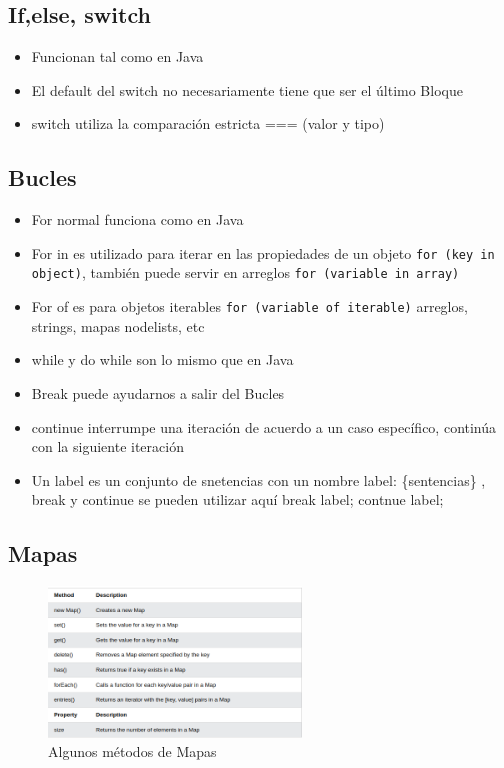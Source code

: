 \documentclass{article}
\begin{document}
 \subsection{If,else, switch}

 \begin{itemize}
   \item Funcionan tal como en Java
   \item El default del switch no necesariamente tiene que ser el último Bloque
   \item switch utiliza la comparación estricta === (valor y tipo)
 \end{itemize}

 \subsection{Bucles}

 \begin{itemize}
   \item For normal funciona como en Java
   \item For in es utilizado para iterar en las propiedades de un objeto \lstinline{for (key in object)}, también puede servir en arreglos \lstinline{for (variable in array)}
   \item For of es para objetos iterables \lstinline{for (variable of iterable)} arreglos, strings, mapas nodelists, etc
   \item while y do while son lo mismo que en Java
   \item Break puede ayudarnos a salir del Bucles
   \item continue  interrumpe una iteración de acuerdo a un caso específico, continúa con la siguiente iteración
   \item Un label es un conjunto de snetencias con un nombre label: \{sentencias\} , break y continue se pueden utilizar aquí break label; contnue label;
 \end{itemize}

 \subsection{Mapas}

 \begin{figure}[H]
   \centering
   \includegraphics[width=0.6\textwidth]{table9.png}
   \caption{Algunos métodos  de Mapas}
 \end{figure}
\end{document}

